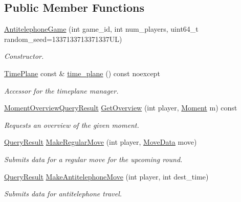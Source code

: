 \subsection*{Public Member Functions}
\begin{DoxyCompactItemize}
\item 
\hyperlink{class_antitelephone_game_a78654d7658827209499cd5fb6650ee61}{Antitelephone\+Game} (int game\+\_\+id, int num\+\_\+players, uint64\+\_\+t random\+\_\+seed=1337133713371337\+U\+L)
\begin{DoxyCompactList}\small\item\em Constructor. \end{DoxyCompactList}\item 
\hyperlink{classtimeplane_1_1_time_plane}{Time\+Plane} const  \& \hyperlink{class_antitelephone_game_adeaf2aa0a4015b04e688e2b694861a9c}{time\+\_\+plane} () const noexcept
\begin{DoxyCompactList}\small\item\em Accessor for the timeplane manager. \end{DoxyCompactList}\item 
\hyperlink{class_antitelephone_game_a99ab937cb4918da1c80bd8d07e43f920}{Moment\+Overview\+Query\+Result} \hyperlink{class_antitelephone_game_a58b493d0ffa0500c515ac413ce52b429}{Get\+Overview} (int player, \hyperlink{classtimeplane_1_1_moment}{Moment} m) const
\begin{DoxyCompactList}\small\item\em Requests an overview of the given moment. \end{DoxyCompactList}\item 
\hyperlink{class_query_result}{Query\+Result} \hyperlink{class_antitelephone_game_ae24e552af1d86bdb0a89636c091d2ba3}{Make\+Regular\+Move} (int player, \hyperlink{classexternal_1_1_move_data}{Move\+Data} move)
\begin{DoxyCompactList}\small\item\em Submits data for a regular move for the upcoming round. \end{DoxyCompactList}\item 
\hyperlink{class_query_result}{Query\+Result} \hyperlink{class_antitelephone_game_a1f2c5e5679d20d1090b247f4229ac0ff}{Make\+Antitelephone\+Move} (int player, int dest\+\_\+time)
\begin{DoxyCompactList}\small\item\em Submits data for antitelephone travel. \end{DoxyCompactList}\item 

\end{DoxyCompactItemize}

